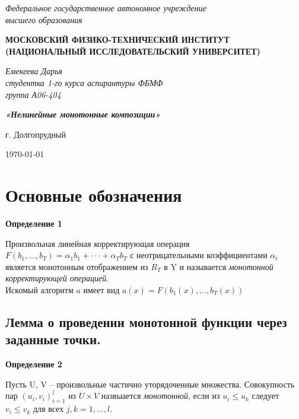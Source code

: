 \documentclass[a4paper,12pt]{article}
\begin{document}
 
\thispagestyle{empty} 
\begin{center} 
\textit{Федеральное государственное автономное учреждение \\ 
высшего образования} 
\vspace{0.5ex} 

\textbf{МОСКОВСКИЙ ФИЗИКО-ТЕХНИЧЕСКИЙ ИНСТИТУТ \\ (НАЦИОНАЛЬНЫЙ ИССЛЕДОВАТЕЛЬСКИЙ УНИВЕРСИТЕТ)} 
\end{center} 
\vspace{13ex} 
\begin{flushright} 
\noindent 
\textit{Емекеева Дарья} 
\\ 
\textit{студентка 1-го курса аспирантуры ФБМФ \\ группа А06-404} 
\end{flushright} 
\begin{center} 
\vspace{13ex}
 
\vspace{1ex} 
\textbf{\textit{«Нелинейные монотонные композиции»}} 

\vfill 
г. Долгопрудный 

\today 
\end{center}

\newpage 

\section{Основные обозначения} 
 \textbf{Определение 1}
 
 Произвольная линейная корректирующая операция $F(b_1,... , b_T ) = \alpha_1 b_1 + · · · + \alpha_T b_T$ с неотрицательными коэффициентами $\alpha_t$ является монотонным отображением из $R_T$ в Y и называется \textit{монотонной корректирующей операцией}.\\
 
 Искомый алгоритм $a$ имеет вид $a(x) = F(b_1(x), . . . , b_T (x))$
 
\subsection*{Лемма о проведении монотонной функции через заданные точки.}
 
 \textbf{Определение 2}
 
 Пусть U, V -- произвольные частично уторядоченные множества. Совокупность пар $(u_i, v_i)_{i=1}^l$ из $U\times V$ назвыается \textit{монотонной}, если из $u_i\leq u_k$ следует $v_i\leq v_k$ для всех $j,k = 1,...,l.$\\
 
\end{document}
